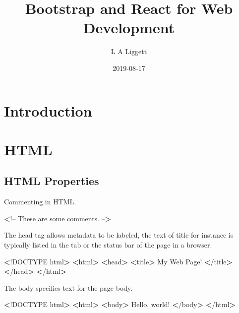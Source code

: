 \documentclass[]{book}
\title{Bootstrap and React for Web Development}
\author{L A Liggett}
\date{2019-08-17}
\newenvironment{Shaded}{\begin{snugshade}}{\end{snugshade}}
\newcommand{\FunctionTok}[1]{\textcolor[rgb]{0.00,0.00,0.00}{#1}}
\newcommand{\OperatorTok}[1]{\textcolor[rgb]{0.81,0.36,0.00}{\textbf{#1}}}
\newcommand{\ExtensionTok}[1]{#1}
\newcommand{\NormalTok}[1]{#1}
\begin{document}
\maketitle

{
\setcounter{tocdepth}{1}
\tableofcontents
}
\chapter{Introduction}\label{introduction}

\chapter{HTML}\label{html}

\section{HTML Properties}\label{html-properties}

Commenting in HTML.

\begin{Shaded}
\begin{Highlighting}[]
\OperatorTok{<}\NormalTok{!}\ExtensionTok{--}
\ExtensionTok{These}\NormalTok{ are some comments.}
\ExtensionTok{--}\OperatorTok{>}
\end{Highlighting}
\end{Shaded}

The head tag allows metadata to be labeled, the text of title for
instance is typically listed in the tab or the status bar of the page in
a browser.

\begin{Shaded}
\begin{Highlighting}[]
\OperatorTok{<}\NormalTok{!}\ExtensionTok{DOCTYPE}\NormalTok{ html}\OperatorTok{>}         
\OperatorTok{<}\ExtensionTok{html}\OperatorTok{>}                  
    \OperatorTok{<}\FunctionTok{head}\OperatorTok{>}              
        \OperatorTok{<}\ExtensionTok{title}\OperatorTok{>}         
            \ExtensionTok{My}\NormalTok{ Web Page!}
        \OperatorTok{<}\NormalTok{/}\ExtensionTok{title}\OperatorTok{>}        
    \OperatorTok{<}\NormalTok{/}\ExtensionTok{head}\OperatorTok{>}             
\OperatorTok{<}\NormalTok{/}\ExtensionTok{html}\OperatorTok{>}                 
\end{Highlighting}
\end{Shaded}

The body specifies text for the page body.

\begin{Shaded}
\begin{Highlighting}[]
\OperatorTok{<}\NormalTok{!}\ExtensionTok{DOCTYPE}\NormalTok{ html}\OperatorTok{>}         
\OperatorTok{<}\ExtensionTok{html}\OperatorTok{>}                  
    \OperatorTok{<}\ExtensionTok{body}\OperatorTok{>}              
        \ExtensionTok{Hello}\NormalTok{, world!   }
    \OperatorTok{<}\NormalTok{/}\ExtensionTok{body}\OperatorTok{>}             
\OperatorTok{<}\NormalTok{/}\ExtensionTok{html}\OperatorTok{>}                 
\end{Highlighting}
\end{Shaded}
\end{document}
